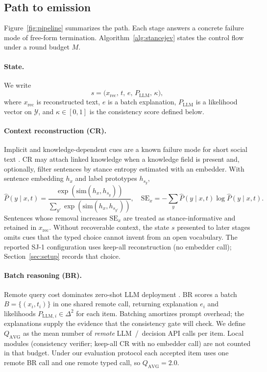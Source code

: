 \documentclass[10pt]{article}
\theoremstyle{definition}
\begin{document}
\subsection{Path to emission}
\label{sec:path}
Figure~\ref{fig:pipeline} summarizes the path.
Each stage answers a concrete failure mode of free-form termination.
Algorithm~\ref{alg:stancejev} states the control flow under a round budget $M$.

\paragraph{State.}
We write
\begin{equation}
s = \bigl(x_{\mathrm{rec}},\, t,\, e,\, P_{\mathrm{LLM}},\, \kappa\bigr),
\end{equation}
where $x_{\mathrm{rec}}$ is reconstructed text, $e$ is a batch explanation, $P_{\mathrm{LLM}}$ is a likelihood
vector on $\mathcal{Y}$, and $\kappa\in[0,1]$ is the consistency score defined below.

\paragraph{Context reconstruction (CR).}
Implicit and knowledge-dependent cues are a known failure mode for short social text
\cite{yan2025cover,chen2024bgem3}.
CR may attach linked knowledge when a knowledge field is present and, optionally, filter sentences by
stance entropy estimated with an embedder.
With sentence embedding $h_x$ and label prototypes $h_{s_y}$,
\begin{equation}
\label{eq:se}
\widehat{P}(y\mid x,t)=\frac{\exp(\mathrm{sim}(h_x,h_{s_y}))}{\sum_{y'}\exp(\mathrm{sim}(h_x,h_{s_{y'}}))},\quad
\mathrm{SE}_x=-\sum_{y}\widehat{P}(y\mid x,t)\log\widehat{P}(y\mid x,t).
\end{equation}
Sentences whose removal increases $\mathrm{SE}_x$ are treated as stance-informative and retained in
$x_{\mathrm{rec}}$.
Without recoverable context, the state $s$ presented to later stages omits cues that the typed choice cannot
invent from an open vocabulary.
The reported SJ-1 configuration uses keep-all reconstruction (no embedder call); Section~\ref{sec:setup}
records that choice.

\paragraph{Batch reasoning (BR).}
Remote query cost dominates zero-shot LLM deployment \cite{yan2025cover,wei2022cot}.
BR scores a batch $B=\{(x_i,t_i)\}$ in one shared remote call, returning explanation $e_i$ and likelihoods
$P_{\mathrm{LLM},i}\in\Delta^{2}$ for each item.
Batching amortizes prompt overhead; the explanations supply the evidence that the consistency gate will check.
We define $Q_{\mathrm{AVG}}$ as the mean number of \emph{remote} LLM~/~decision API calls per item.
Local modules (consistency verifier; keep-all CR with no embedder call) are not counted in that budget.
Under our evaluation protocol each accepted item uses one remote BR call and one remote typed call, so
$Q_{\mathrm{AVG}}{=}2.0$.
\end{document}

